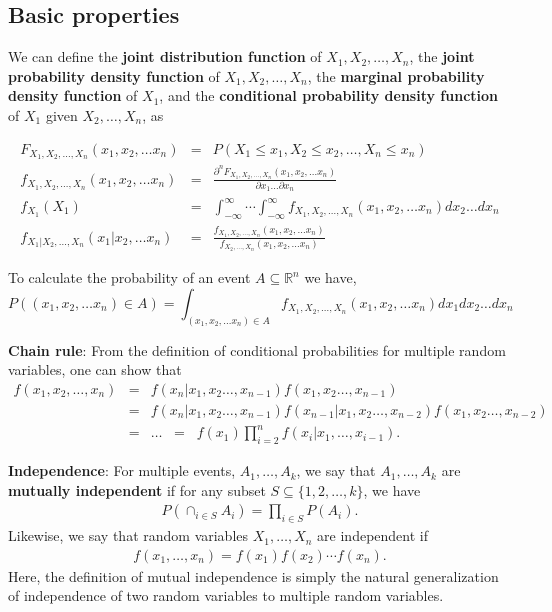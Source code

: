 \documentclass{article}
\begin{document}
\subsection{Basic properties}

We can define the \textbf{joint distribution function} of $X_1,X_2,\ldots,X_n$, 
the \textbf{joint probability density function} of $X_1,X_2,\ldots,X_n$, 
the \textbf{marginal probability density function} of $X_1$, and
the \textbf{conditional probability density function} of $X_1$ given $X_2,\ldots,X_n$, as

\begin{eqnarray*}
F_{X_1, X_2, \ldots, X_n}(x_1,x_2, \ldots x_n) &=& P(X_1 \leq x_1, X_2 \leq x_2, \ldots, X_n \leq x_n) \\
f_{X_1, X_2, \ldots, X_n}(x_1,x_2, \ldots x_n) &=& \frac{\partial^n F_{X_1, X_2, \ldots, X_n}(x_1,x_2, \ldots x_n)}{\partial x_1 \ldots \partial x_n} \\
f_{X_1}(X_1) &=& \int_{-\infty}^\infty \cdots \int_{-\infty}^\infty f_{X_1, X_2, \ldots, X_n}(x_1,x_2, \ldots x_n) dx_2 \ldots dx_n \\
f_{X_1 | X_2, \ldots, X_n}(x_1|x_2, \ldots x_n) &=& \frac{f_{X_1, X_2, \ldots, X_n}(x_1,x_2, \ldots x_n)}{f_{ X_2, \ldots, X_n}(x_1,x_2, \ldots x_n)}
\end{eqnarray*}

To calculate the probability of an event $A \subseteq \mathbb{R}^n$ we have,
\begin{equation}
P((x_1,x_2, \ldots x_n) \in A)= \int_{(x_1,x_2, \ldots x_n) \in A} f_{X_1,X_2,\ldots,X_n}(x_1,x_2, \ldots x_n)dx_1dx_2 \ldots dx_n
\end{equation}

\textbf{Chain rule}: From the
definition of conditional probabilities for multiple random variables, one can show that
\begin{eqnarray*}
  f(x_1,x_2,\ldots,x_n) &=& f(x_n|x_1,x_2\ldots,x_{n-1}) f(x_1,x_2\ldots,x_{n-1}) \\
  &=& f(x_n|x_1,x_2\ldots,x_{n-1}) f(x_{n-1} | x_1,x_2\ldots,x_{n-2}) f(x_1,x_2\ldots,x_{n-2}) \\
  &=& \ldots\;\; =\;\; f(x_1) \prod_{i=2}^n f(x_i | x_1,\ldots,x_{i-1}).
\end{eqnarray*}

\textbf{Independence}:
For multiple events, $A_1,\ldots,A_k$,
we say that $A_1,\ldots,A_k$ are \textbf{mutually independent} if for any
subset $S \subseteq \{1,2,\ldots,k\}$, we have
\begin{eqnarray*}
  P(\cap_{i \in S} A_i) = \prod_{i \in S} P(A_i).
\end{eqnarray*}
Likewise, we say that random variables $X_1,\ldots,X_n$ are independent if
\begin{eqnarray*}
  f(x_1,\ldots,x_n) = f(x_1)f(x_2) \cdots f(x_n).
\end{eqnarray*}
Here, the definition of mutual independence is simply the natural generalization of independence of two random variables to multiple random variables.
\end{document}
